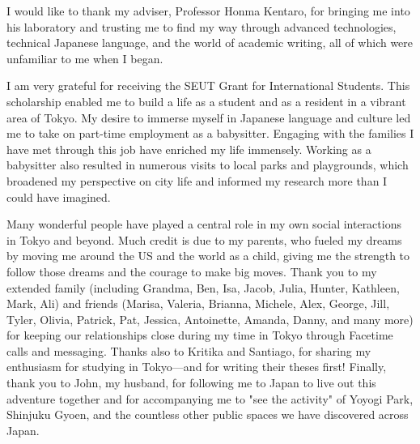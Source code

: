 \noindent I would like to thank my adviser, Professor Honma Kentaro, for bringing me into his laboratory and trusting me to find my way through advanced technologies, technical Japanese language, and the world of academic writing, all of which were unfamiliar to me when I began.

\noindent I am very grateful for receiving the SEUT Grant for International Students. This scholarship enabled me to build a life as a student and as a resident in a vibrant area of Tokyo. My desire to immerse myself in Japanese language and culture  led me to take on  part-time employment as a babysitter. Engaging with the families I have met through this job have enriched my life immensely. Working as a babysitter also resulted in numerous visits to local parks and playgrounds, which broadened my perspective on city life and informed my research more than I could have imagined. 

\noindent Many wonderful people have played a central role in my own social interactions in Tokyo and beyond. Much credit is due to my parents, who fueled my dreams by moving me around the US and the world as a child, giving me the strength to follow those dreams and the courage to make big moves. Thank you to my extended family (including Grandma, Ben, Isa, Jacob, Julia, Hunter, Kathleen, Mark, Ali) and friends (Marisa, Valeria, Brianna, Michele, Alex, George, Jill, Tyler, Olivia, Patrick, Pat, Jessica, Antoinette, Amanda, Danny, and many more) for keeping our relationships close during my time in Tokyo through Facetime calls and messaging. Thanks also to Kritika and Santiago, for sharing my enthusiasm for studying in Tokyo---and for writing their theses first! Finally, thank you to John, my husband, for following me to Japan to live out this adventure together and for accompanying me to "see the activity" of Yoyogi Park, Shinjuku Gyoen, and the countless other public spaces we have discovered across Japan.